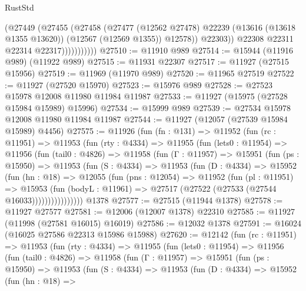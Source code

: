 \begin{lexlean}{RustStd}
\begin{coremodule}
                          (@27449
                            (@27455
                              (@27458
                                (@27477
                                  (@12562 @27478)
                                  @22239
                                  (@13616 (@13618 @1355 @13620))
                                  (@12567 (@12569 @1355))
                                  @12578))
                              @22303))
                          @22308
                          @22311
                          @22314
                          @22317)))))))))))
@27510 := @11910 @989
@27514 := @15944 (@11916 @989) (@11922 @989)
@27515 := @11931 @22307
@27517 := @11927 (@27515 @15956)
@27519 := @11969 (@11970 @989)
@27520 := @11965 @27519
@27522 := @11927 (@27520 @15970)
@27523 := @15976 @989
@27528 := @27523 @15978 @12008 @11980 @11984 @11987
@27533 := @11927 (@15975 (@27528 @15984 @15989) @15996)
@27534 := @15999 @989
@27539 := @27534 @15978 @12008 @11980 @11984 @11987
@27544 := @11927 (@12057 (@27539 @15984 @15989) @4456)
@27575 := @11926
    (fun (fn : @131) =>
    @11952
      (fun (rc : @11951) =>
      @11953
        (fun (rty : @4334) =>
        @11955
          (fun (lets0 : @11954) =>
          @11956
            (fun (tail0 : @4826) =>
            @11958
              (fun (Γ : @11957) =>
              @15951
                (fun (ps : @15950) =>
                @11953
                  (fun (S : @4334) =>
                  @11953
                    (fun (D : @4334) =>
                    @15952
                      (fun (hn : @18) =>
                      @12055
                        (fun (pns : @12054) =>
                        @11952
                          (fun (pl : @11951) =>
                          @15953
                            (fun (bodyL : @11961) =>
                            @27517 (@27522 (@27533 (@27544 @16033))))))))))))))))
    @1378
@27577 := @27515 (@11944 @1378)
@27578 := @11927 @27577
@27581 := @12006 (@12007 @1378) @22310
@27585 := @11927 (@11998 (@27581 @16015) @16019)
@27586 := @12032 @1378
@27591 := @16024 (@16025 @27586 @22313 @15986 @15988)
@27620 := @12142
    (fun (rc : @11951) =>
    @11953
      (fun (rty : @4334) =>
      @11955
        (fun (lets0 : @11954) =>
        @11956
          (fun (tail0 : @4826) =>
          @11958
            (fun (Γ : @11957) =>
            @15951
              (fun (ps : @15950) =>
              @11953
                (fun (S : @4334) =>
                @11953
                  (fun (D : @4334) =>
                  @15952
                    (fun (hn : @18) =>

\end{coremodule}
\end{lexlean}
